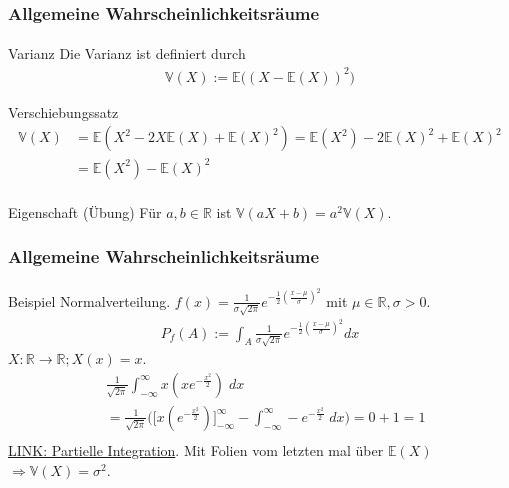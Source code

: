 \documentclass{beamer}
\begin{document}
\begin{frame}
    \frametitle{Allgemeine Wahrscheinlichkeitsräume}
\framesubtitle{}

\begin{block}{Varianz}
Die Varianz ist definiert durch
\begin{align*}
\mathbb{V}(X) :=\mathbb{E} \bigl( (X - \mathbb{E}(X))^2 \bigr)
\end{align*}
\end{block}

\begin{block}{Verschiebungssatz}
\begin{align*}
 \mathbb{V}(X) & = \mathbb{E}(X^2 - 2X \mathbb{E}(X) + \mathbb{E}(X)^2) = \mathbb{E}(X^2) - 2 \mathbb{E}(X)^2 +  \mathbb{E}(X)^2 \\
& =  \mathbb{E}(X^2) -  \mathbb{E}(X)^2 \\
\end{align*}
\end{block}
\begin{block}{Eigenschaft (Übung)} 
Für $a,b \in \mathbb{R}$ ist $\mathbb{V}(aX + b)  = a^2   \mathbb{V}(X)$.
\end{block}

 \end{frame}

\begin{frame}
    \frametitle{Allgemeine Wahrscheinlichkeitsräume}
\framesubtitle{}

\begin{block}{Beispiel}
Normalverteilung. $ f(x) = \frac 1{\sigma \sqrt{2\pi}}e^{- \frac {1}{2} (\frac{x- \mu}{ \sigma})^2}$ mit $\mu \in \mathbb{R}, \sigma > 0 $.
\begin{align*}
P_f (A) := \int_{A}  \frac 1{\sigma \sqrt{2\pi}}e^{- \frac {1}{2} (\frac{x- \mu}{ \sigma})^2}dx
\end{align*}
$X: \mathbb{R} \to \mathbb{R} ; X(x) = x$.
\begin{align*}
& \frac{1}{\sqrt{2 \pi}} \int_{- \infty}^{\infty} x (xe^{- \frac{x^2}{2}}) \; dx \\
& =  \frac{1}{\sqrt{2 \pi}} \biggl (\biggl [ x (e^{- \frac{x^2}{2}}) \biggr]_{- \infty}^{\infty}   - \int_{- \infty}^{\infty}  - e^{- \frac{x^2}{2}} \; dx  \biggr) = 0 + 1 = 1\\
\end{align*}
\href{https://de.wikipedia.org/wiki/Partielle_Integration}{LINK: Partielle Integration}. Mit Folien vom letzten mal über $\mathbb{E}(X)$
$\Rightarrow \mathbb{V}(X) = \sigma^2$.
\end{block}

 \end{frame}
\end{document}
